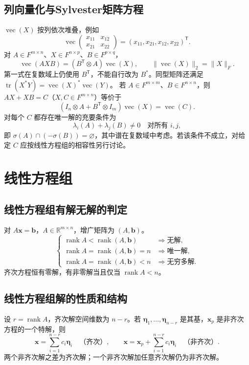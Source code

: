 \documentclass[../main.tex]{subfiles}
\begin{document}
\subsection{列向量化与Sylvester矩阵方程}
$\operatorname{vec}(X)$ 按列依次堆叠，例如
\[
\operatorname{vec}\begin{pmatrix}x_{11}&x_{12}\\x_{21}&x_{22}\end{pmatrix}
=(x_{11},x_{21},x_{12},x_{22})^{\mathsf T}.
\]
对 $A\in F^{m\times n}$、$X\in F^{n\times p}$、$B\in F^{p\times q}$，
\[
\operatorname{vec}(AXB)=(B^{\mathsf T}\otimes A)\operatorname{vec}(X),\qquad
\|\operatorname{vec}(X)\|_2=\|X\|_F.
\]
第一式在复数域上仍使用 $B^{\mathsf T}$，不能自行改为 $B^*$。同型矩阵还满足 $\operatorname{tr}(X^*Y)=\operatorname{vec}(X)^*\operatorname{vec}(Y)$。
若 $A\in F^{m\times m}$、$B\in F^{n\times n}$，则 $AX+XB=C$（$X,C\in F^{m\times n}$）等价于
\[
(I_n\otimes A+B^{\mathsf T}\otimes I_m)\operatorname{vec}(X)
=\operatorname{vec}(C).
\]
对每个 $C$ 都存在唯一解的充要条件为
\[
\lambda_i(A)+\lambda_j(B)\ne0\quad\text{对所有 }i,j,
\]
即 $\sigma(A)\cap(-\sigma(B))=\varnothing$，其中谱在复数域中考虑。若该条件不成立，对给定 $C$ 应按线性方程组的相容性另行讨论。
\section{线性方程组}
\subsection{线性方程组有解无解的判定}
对 $A\bm x=\bm b$，$A\in\mathbb R^{m\times n}$，增广矩阵为 $(A,\bm b)$。
\[
\begin{cases}
\operatorname{rank}A<\operatorname{rank}(A,\bm b)&\Longrightarrow\text{无解},\\
\operatorname{rank}A=\operatorname{rank}(A,\bm b)=n&\Longrightarrow\text{唯一解},\\
\operatorname{rank}A=\operatorname{rank}(A,\bm b)<n&\Longrightarrow\text{无穷多解}.
\end{cases}
\]
齐次方程恒有零解，有非零解当且仅当 $\operatorname{rank}A<n$。
\subsection{线性方程组解的性质和结构}
设 $r=\operatorname{rank}A$，齐次解空间维数为 $n-r$。若 $\bm\eta_1,\ldots,\bm\eta_{n-r}$ 是其基，$\bm x_p$ 是非齐次方程的一个特解，则
\[
\bm x=\sum_{i=1}^{n-r}c_i\bm\eta_i\quad\text{（齐次）},\qquad
\bm x=\bm x_p+\sum_{i=1}^{n-r}c_i\bm\eta_i\quad\text{（非齐次）}.
\]
两个非齐次解之差为齐次解；一个非齐次解加任意齐次解仍为非齐次解。
\end{document}
